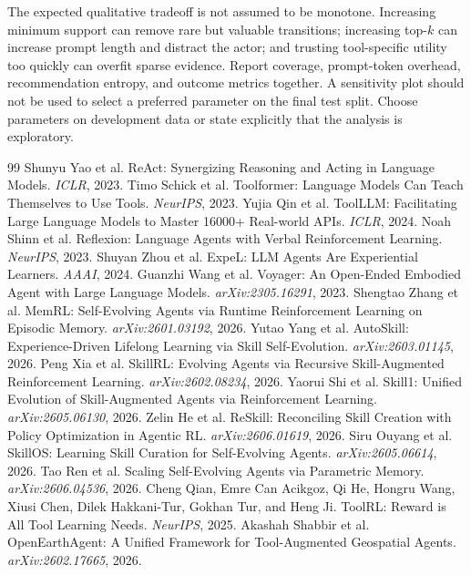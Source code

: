 \documentclass[10pt]{article}
\begin{document}
The expected qualitative tradeoff is not assumed to be monotone. Increasing minimum support can remove rare but valuable transitions; increasing top-$k$ can increase prompt length and distract the actor; and trusting tool-specific utility too quickly can overfit sparse evidence. Report coverage, prompt-token overhead, recommendation entropy, and outcome metrics together. A sensitivity plot should not be used to select a preferred parameter on the final test split. Choose parameters on development data or state explicitly that the analysis is exploratory.

\begin{thebibliography}{99}
 Shunyu Yao et al. ReAct: Synergizing Reasoning and Acting in Language Models. \emph{ICLR}, 2023.
 Timo Schick et al. Toolformer: Language Models Can Teach Themselves to Use Tools. \emph{NeurIPS}, 2023.
 Yujia Qin et al. ToolLLM: Facilitating Large Language Models to Master 16000+ Real-world APIs. \emph{ICLR}, 2024.
 Noah Shinn et al. Reflexion: Language Agents with Verbal Reinforcement Learning. \emph{NeurIPS}, 2023.
 Shuyan Zhou et al. ExpeL: LLM Agents Are Experiential Learners. \emph{AAAI}, 2024.
 Guanzhi Wang et al. Voyager: An Open-Ended Embodied Agent with Large Language Models. \emph{arXiv:2305.16291}, 2023.
 Shengtao Zhang et al. MemRL: Self-Evolving Agents via Runtime Reinforcement Learning on Episodic Memory. \emph{arXiv:2601.03192}, 2026.
 Yutao Yang et al. AutoSkill: Experience-Driven Lifelong Learning via Skill Self-Evolution. \emph{arXiv:2603.01145}, 2026.
 Peng Xia et al. SkillRL: Evolving Agents via Recursive Skill-Augmented Reinforcement Learning. \emph{arXiv:2602.08234}, 2026.
 Yaorui Shi et al. Skill1: Unified Evolution of Skill-Augmented Agents via Reinforcement Learning. \emph{arXiv:2605.06130}, 2026.
 Zelin He et al. ReSkill: Reconciling Skill Creation with Policy Optimization in Agentic RL. \emph{arXiv:2606.01619}, 2026.
 Siru Ouyang et al. SkillOS: Learning Skill Curation for Self-Evolving Agents. \emph{arXiv:2605.06614}, 2026.
 Tao Ren et al. Scaling Self-Evolving Agents via Parametric Memory. \emph{arXiv:2606.04536}, 2026.
 Cheng Qian, Emre Can Acikgoz, Qi He, Hongru Wang, Xiusi Chen, Dilek Hakkani-Tur, Gokhan Tur, and Heng Ji. ToolRL: Reward is All Tool Learning Needs. \emph{NeurIPS}, 2025.
 Akashah Shabbir et al. OpenEarthAgent: A Unified Framework for Tool-Augmented Geospatial Agents. \emph{arXiv:2602.17665}, 2026.
\end{thebibliography}
\end{document}
